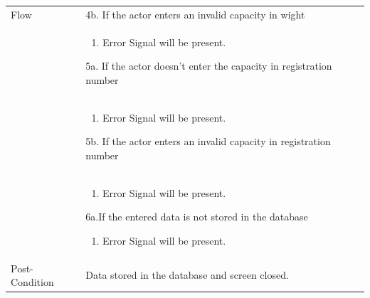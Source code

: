 \documentclass[12pt,a4paper]{report}
\begin{document}
\begin{tabular}{ | m{3cm} | m{12cm}| } \hline
Flow & 
4b. If the actor enters an invalid capacity in wight\\ 	
&	\begin{enumerate}
		\item Error Signal will be present.
	\end{enumerate}
5a. If the actor doesn't enter the capacity in registration number\\ 	
&	\begin{enumerate}
		\item Error Signal will be present.
	\end{enumerate}
5b. If the actor enters an invalid capacity in registration number\\ 	
&	\begin{enumerate}
		\item Error Signal will be present.
	\end{enumerate}
6a.If the entered data is not stored in the database  
	\begin{enumerate}
		\item Error Signal will be present.
	\end{enumerate}
\\ \hline
Post-Condition &  Data stored in the database and screen closed. \\\hline
\end{tabular}
\end{document}
